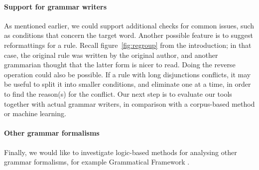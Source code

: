 
\paragraph{Support for grammar writers}
As mentioned earlier, we could support additional checks for common issues,
such as conditions that concern the target word.
Another possible feature is to suggest reformattings for a rule. Recall
figure~\ref{fig:regroup} from the introduction; in that case, the
original rule was written by the original author, and another
grammarian thought that the latter form is nicer to read. Doing the
reverse operation could also be possible. If a rule with long
disjunctions conflicts, it may be useful to split it into smaller
conditions, and eliminate one at a time, in order to find the
reason(s) for the conflict.
Our next step is to evaluate our tools together with actual grammar writers,
in comparison with a corpus-based method or machine learning.

\paragraph{Other grammar formalisms}
Finally, we would like to investigate logic-based methods for analysing other grammar
formalisms, for example Grammatical Framework \cite{ranta2010gfbook}.




